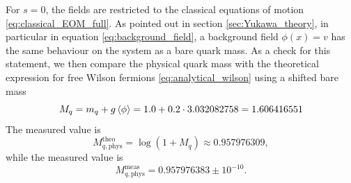 For $s=0$, the fields are restricted to the classical equations of motion \eqref{eq:classical_EOM_full}. As pointed out in section \ref{sec:Yukawa_theory}, in particular in equation \eqref{eq:background_field}, a background field $\phi(x) = v$ has the same behaviour on the system as a bare quark mass. As a check for this statement, we then compare the physical quark mass with the theoretical expression for free Wilson fermions \eqref{eq:analytical_wilson} using a shifted bare mass 
\begin{equation*}
	M_q = m_q + g \left\langle \phi \right\rangle = 1.0 + 0.2 \cdot 3.032082758 = 1.606416551
\end{equation*}
The measured value is
\begin{equation*}
    M_{q, \text{phys}}^\text{theo} = \log\left(1 + M_q\right) \approx 0.957976309,
\end{equation*}
while the measured value is 
\begin{equation*}
    M_{q, \text{phys}}^\text{meas} = 0.957976383 \pm 10^{-10}.
\end{equation*}

\newpage



